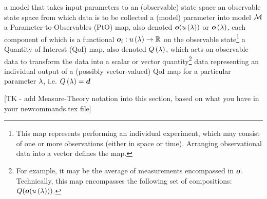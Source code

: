 \begin{itemize}
\itembox{$\M$} a model that takes input parameters to an (observable) state space
 an observable state space from which data is to be collected
\itembox{$\param$} a (model) parameter into model $\M$
\itembox{$\obs$} a Parameter-to-Observables (PtO) map, also denoted $\operatorname*{\boldsymbol{o}}( u\left ( \lambda \right ) )$ or $\operatorname*{\boldsymbol{o}}\left ( \lambda \right )$, each component of which is a functional  $\operatorname*{\boldsymbol{o}}_i: u\left ( \lambda \right ) \to \mathbb{R}$ on the observable state\footnote{This map represents performing an individual experiment, which may consist of one or more observations (either in space or time). Arranging observational data into a vector defines the map.}
\itembox{$\qoi$} a Quantity of Interest (QoI) map, also denoted $Q\left ( \lambda \right )$, which acts on observable data to transform the data into a scalar or vector quantity\footnote{For example, it may be the average of measurements encompassed in $\obs$. Technically, this map encompasses the following set of compositions: $Q(\operatorname*{\boldsymbol{o}}(u\left ( \lambda \right )))$.}
\itembox{$\data$} data representing an individual output of a (possibly vector-valued) QoI map for a particular parameter $\param$, i.e. $Q\left ( \lambda \right ) = \operatorname*{\boldsymbol{d}}$
\end{itemize}

[TK - add Measure-Theory notation into this section, based on what you have in your newcommands.tex file]
